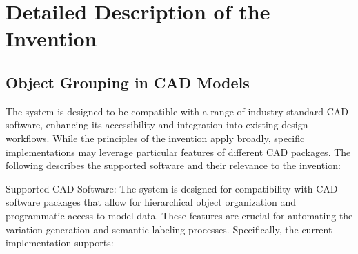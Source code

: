 \documentclass{article}
\begin{document}





\section{Detailed Description of the Invention}

\subsection{Object Grouping in CAD Models}

The system is designed to be compatible with a range of industry-standard CAD software, enhancing its accessibility and integration into existing design workflows. While the principles of the invention apply broadly, specific implementations may leverage particular features of different CAD packages. The following describes the supported software and their relevance to the invention:

Supported CAD Software: The system is designed for compatibility with CAD software packages that allow for hierarchical object organization and programmatic access to model data. These features are crucial for automating the variation generation and semantic labeling processes. Specifically, the current implementation supports:
\end{document}
